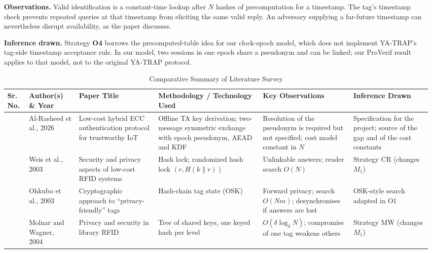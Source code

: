 \textbf{Observations.} Valid identification is a constant-time lookup after $N$ hashes of precomputation for a timestamp. The tag's timestamp check prevents repeated queries at that timestamp from eliciting the same valid reply. An adversary supplying a far-future timestamp can nevertheless disrupt availability, as the paper discusses.

\textbf{Inference drawn.} Strategy \textbf{O4} borrows the precomputed-table idea for our clock-epoch model, which does not implement YA-TRAP's tag-side timestamp acceptance rule. In our model, two sessions in one epoch share a pseudonym and can be linked; our ProVerif result applies to that model, not to the original YA-TRAP protocol.

\FloatBarrier
\begin{table}[H]
\centering
\caption{Comparative Summary of Literature Survey}
\label{tab:litsurvey}
\footnotesize
\renewcommand{\arraystretch}{1.15}
\begin{tabularx}{\textwidth}{|>{\centering\arraybackslash}p{}|p{}|>{\raggedright\arraybackslash}p{}|>{\raggedright\arraybackslash}X|>{\raggedright\arraybackslash}X|>{\raggedright\arraybackslash}X|}
\hline
\textbf{Sr. No.} & \textbf{Author(s) \& Year} & \textbf{Paper Title} & \textbf{Methodology / Technology Used} & \textbf{Key Observations} & \textbf{Inference Drawn}\\ \hline
1 & Al-Rasheed et al., 2026~\cite{base} & Low-cost hybrid ECC authentication protocol for trustworthy IoT & Offline TA key derivation; two-message symmetric exchange with epoch pseudonym, AEAD and KDF & Resolution of the pseudonym is required but not specified; cost model constant in $N$ & Specification for the project; source of the gap and of the cost constants\\ \hline
2 & Weis et al., 2003~\cite{weis} & Security and privacy aspects of low-cost RFID systems & Hash lock; randomized hash lock $(r,H(k\|r))$ & Unlinkable answers; reader search $O(N)$ & Strategy CR (changes $M_1$)\\ \hline
3 & Ohkubo et al., 2003~\cite{ohkubo} & Cryptographic approach to ``privacy-friendly'' tags & Hash-chain tag state (OSK) & Forward privacy; search $O(Nm)$; desynchronises if answers are lost & OSK-style search adapted in O1\\ \hline
4 & Molnar and Wagner, 2004~\cite{molnar} & Privacy and security in library RFID & Tree of shared keys, one keyed hash per level & $O(\delta\log_\delta N)$; compromise of one tag weakens others & Strategy MW (changes $M_1$)\\ \hline

\end{tabularx}
\end{table}
